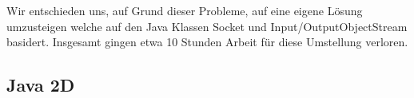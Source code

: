 \documentclass[a4paper,12pt,halfparskip,DIV14]{scrartcl}
\begin{document}
Wir entschieden uns, auf Grund dieser Probleme, auf eine eigene Lösung umzusteigen welche auf den Java Klassen Socket und Input/OutputObjectStream basidert. Insgesamt gingen etwa 10 Stunden Arbeit für diese Umstellung verloren.


\subsection{Java 2D} %
\label{sub:java_2d}


\end{document}
